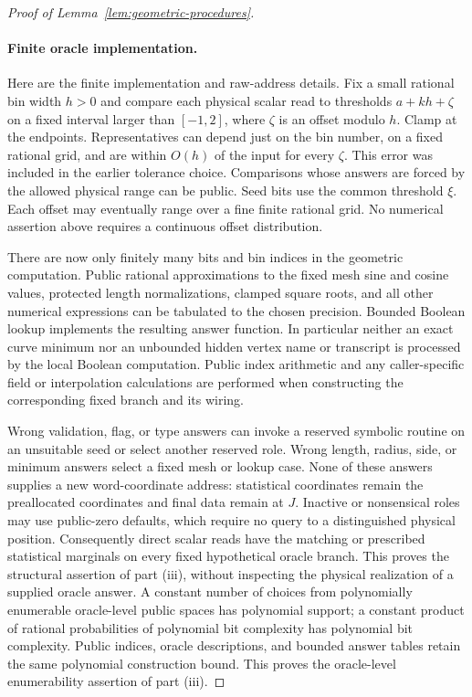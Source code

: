 \begin{proof}[Proof of Lemma~\ref{lem:geometric-procedures}]
\paragraph{Finite oracle implementation.}
Here are the finite implementation and raw-address details. Fix a small
rational bin width $h>0$ and compare each physical scalar read to
thresholds $a+kh+\zeta$ on a fixed interval larger than $[-1,2]$,
where $\zeta$ is an offset modulo $h$. Clamp at the endpoints.
Representatives can depend just on the bin number, on a fixed rational
grid, and are within $O(h)$ of the input for every $\zeta$. This
error was included in the earlier tolerance choice. Comparisons whose
answers are forced by the allowed physical range can be public.
Seed bits use the common threshold $\xi$. Each offset may eventually
range over a fine finite rational grid. No numerical assertion above
requires a continuous offset distribution.

There are now only finitely many bits and bin indices in the geometric
computation. Public rational approximations to the fixed mesh sine and
cosine values, protected length normalizations, clamped square roots,
and all other numerical expressions can be tabulated to the chosen
precision. Bounded Boolean lookup implements the resulting answer
function. In particular neither an exact curve minimum nor an
unbounded hidden vertex name or transcript is processed by the local
Boolean computation. Public index arithmetic and any caller-specific
field or interpolation calculations are performed when constructing
the corresponding fixed branch and its wiring.

Wrong validation, flag, or type answers can invoke a reserved symbolic
routine on an unsuitable seed or select another reserved role. Wrong
length, radius, side, or minimum answers select a fixed mesh or lookup
case. None of these answers supplies a new word-coordinate address:
statistical coordinates remain the preallocated coordinates and final
data remain at $J$. Inactive or nonsensical roles may use public-zero
defaults, which require no query to a distinguished physical position.
Consequently direct scalar reads have the matching or prescribed
statistical marginals on every fixed hypothetical oracle branch. This
proves the structural assertion of part (iii), without inspecting the
physical realization of a supplied oracle answer. A constant number
of choices from polynomially enumerable oracle-level public spaces
has polynomial support; a constant product of rational probabilities
of polynomial bit complexity has polynomial bit complexity. Public
indices, oracle descriptions, and bounded answer tables retain the
same polynomial construction bound. This proves the oracle-level
enumerability assertion of part (iii).


\end{proof}
